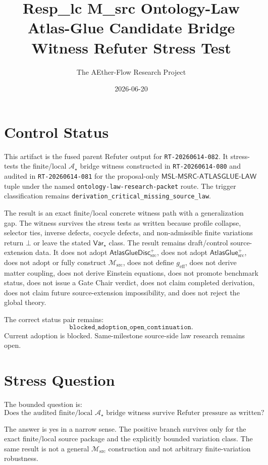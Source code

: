 \documentclass[11pt]{article}
\title{Resp\_lc M\_src Ontology-Law Atlas-Glue Candidate Bridge Witness Refuter Stress Test}
\author{The AEther-Flow Research Project}
\date{2026-06-20}
\newcommand{\Msrc}{\mathcal{M}_{\mathrm{src}}}
\newcommand{\geff}{g_{\mathrm{eff}}}
\newcommand{\AtlasGlue}{\mathsf{AtlasGlue}_{\mathrm{src}}^{+}}
\newcommand{\AtlasGlueDisc}{\mathsf{AtlasGlueDisc}_{\mathrm{src}}^{+}}
\newcommand{\MSL}{\mathsf{MSL}\mbox{-}\mathsf{MSRC}\mbox{-}\mathsf{ATLASGLUE}\mbox{-}\mathsf{LAW}}
\newcommand{\Bot}{\bot}
\newcommand{\Astar}{\mathcal A_{\star}}
\newcommand{\Varstar}{\mathsf{Var}_{\star}}
\begin{document}
\maketitle

\section*{Control Status}

This artifact is the fused parent Refuter output for
\texttt{RT-20260614-082}. It stress-tests the finite/local
\(\Astar\) bridge witness constructed in \texttt{RT-20260614-080} and
audited in \texttt{RT-20260614-081} for the proposal-only \(\MSL\) tuple
under the named \texttt{ontology-law-research-packet} route. The trigger
classification remains \texttt{derivation\_critical\_missing\_source\_law}.

The result is an exact finite/local concrete witness path with a
generalization gap. The witness survives the stress tests as written because
profile collapse, selector ties, inverse defects, cocycle defects, and
non-admissible finite variations return \(\Bot\) or leave the stated
\(\Varstar\) class. The result remains draft/control source-extension data.
It does not adopt \(\AtlasGlueDisc\), does not adopt \(\AtlasGlue\), does not
adopt or fully construct \(\Msrc\), does not define \(\geff\), does not derive
matter coupling, does not derive Einstein equations, does not promote
benchmark status, does not issue a Gate Chair verdict, does not claim
completed derivation, does not claim future source-extension impossibility,
and does not reject the global theory.

The correct status pair remains:
\[
  \texttt{blocked\_adoption\_open\_continuation}.
\]
Current adoption is blocked. Same-milestone source-side law research remains
open.

\section{Stress Question}

The bounded question is:
\[
\text{Does the audited finite/local }\Astar\text{ bridge witness survive
Refuter pressure as written?}
\]

The answer is yes in a narrow sense. The positive branch survives only for the
exact finite/local source package and the explicitly bounded variation class.
The same result is not a general \(\Msrc\) construction and not arbitrary
finite-variation robustness.
\end{document}
